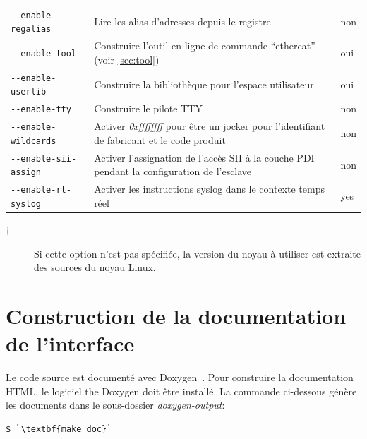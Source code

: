 \documentclass[a4paper,12pt,BCOR=6mm,bibtotoc,idxtotoc]{scrbook}
\begin{document}
\begin{longtable}{l|p{}|l}
\lstinline+--enable-regalias+ & Lire les alias d'adresses depuis le
registre & non\\

\lstinline+--enable-tool+ & Construire l'outil en ligne de commande
``ethercat'' (voir \autoref{sec:tool}) & oui\\

\lstinline+--enable-userlib+ & Construire la biblioth\`eque pour
l'espace utilisateur & oui\\

\lstinline+--enable-tty+ & Construire le pilote TTY & non\\

\lstinline+--enable-wildcards+ & Activer \textit{0xffffffff} pour \^etre
un jocker pour l'identifiant de fabricant et le code produit & non\\

\lstinline+--enable-sii-assign+ & Activer l'assignation de l'acc\`es SII
\`a la couche PDI pendant la configuration de l'esclave & non\\

\lstinline+--enable-rt-syslog+ & Activer les instructions syslog dans
le contexte temps r\'eel & yes\\

\hline

\end{longtable}

\begin{description}

\item[$\dagger$] Si cette option n'est pas sp\'ecifi\'ee, la version du noyau
  \`a utiliser est extraite des sources du noyau Linux.

\end{description}

\section{Construction de la documentation de l'interface}
\label{sec:gendoc}

Le code source est document\'e avec
Doxygen~\cite{doxygen}. Pour construire la documentation HTML,
le logiciel the Doxygen doit \^etre install\'e. La commande ci-dessous
g\'en\`ere les documents dans le sous-dossier \textit{doxygen-output}:

\begin{lstlisting}
$ `\textbf{make doc}`
\end{lstlisting}
\end{document}
